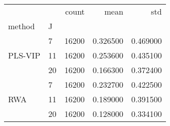 \begin{tabular}{llrrr}
\toprule
 &  & count & mean & std \\
method & J &  &  &  \\
\midrule
\multirow[t]{3}{*}{PLS-VIP} & 7 & 16200 & 0.326500 & 0.469000 \\
 & 11 & 16200 & 0.253600 & 0.435100 \\
 & 20 & 16200 & 0.166300 & 0.372400 \\
\cline{1-5}
\multirow[t]{3}{*}{RWA} & 7 & 16200 & 0.232700 & 0.422500 \\
 & 11 & 16200 & 0.189000 & 0.391500 \\
 & 20 & 16200 & 0.128000 & 0.334100 \\
\cline{1-5}
\bottomrule
\end{tabular}
